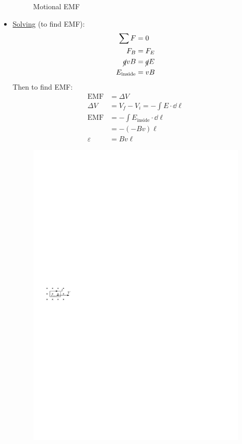 \documentclass{article}
\begin{document}
\begin{itemize}
\begin{figure}[H]
        \caption{Motional EMF}
      \end{figure}
      \item \underline{Solving} (to find EMF):
      \begin{align*}
        \sum F &= 0\\
        F_B & = F_E\\
        \cancel{q} vB & = \cancel{q}E\\
        E_{\mathrm{inside}} &= vB
      \end{align*}
      Then to find EMF:
      \begin{align*}
        \text{EMF} & =\Delta V\\
        \Delta V & = V_f-V_i=-\int E\cdot \dd \ell\\
        \text{EMF} & = - \int E_{\mathrm{inside}} \cdot \dd \ell\\ 
         & = -(-Bv)\ell\\
        \varepsilon & = Bv\ell
      \end{align*}
      \begin{figure}[H]
        \centering
        \includegraphics{figures/faraday2.pdf}

\end{figure}
\end{itemize}
\end{document}
